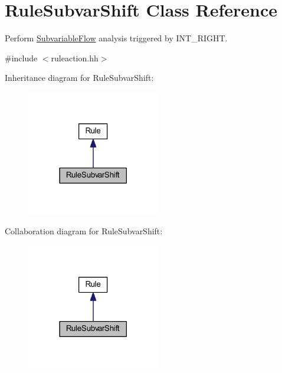 \hypertarget{class_rule_subvar_shift}{}\section{Rule\+Subvar\+Shift Class Reference}
\label{class_rule_subvar_shift}


Perform \mbox{\hyperlink{class_subvariable_flow}{Subvariable\+Flow}} analysis triggered by I\+N\+T\+\_\+\+R\+I\+G\+HT.  




{\ttfamily \#include $<$ruleaction.\+hh$>$}



Inheritance diagram for Rule\+Subvar\+Shift\+:
\nopagebreak
\begin{figure}[H]
\begin{center}
\leavevmode
\includegraphics[width=165pt]{class_rule_subvar_shift__inherit__graph}
\end{center}
\end{figure}


Collaboration diagram for Rule\+Subvar\+Shift\+:
\nopagebreak
\begin{figure}[H]
\begin{center}
\leavevmode
\includegraphics[width=165pt]{class_rule_subvar_shift__coll__graph}
\end{center}
\end{figure}
